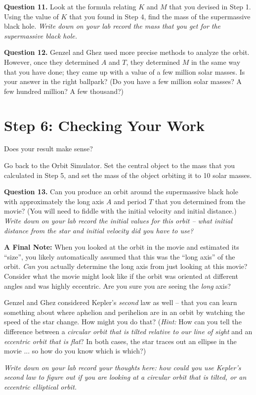 \documentclass[11pt]{article}
\begin{document}
{\bf Question 11.} Look at the formula relating $K$ and $M$ that you devised in Step 1. Using the value of $K$ that you found in Step 4, find the mass of the supermassive black hole. {\it Write down on your lab record the mass that you get for the supermassive black hole.}




{\bf Question 12.} Genzel and Ghez used more precise methods to analyze the orbit. However, once they determined $A$ and $T$, they determined $M$ in the same way that you have done; they came up with a value of a few million solar masses. Is your answer in the right ballpark? (Do you have a few million solar masses? A few hundred million? A few thousand?)

\section{Step 6: Checking Your Work}

Does your result make sense?

Go back to the Orbit Simulator. Set the central object to the mass that you calculated in Step 5, and set the mass of the object orbiting it to 10 solar masses. 


{\bf Question 13.} Can you produce an orbit around the supermassive black hole with approximately the long axis $A$ and period $T$ that you determined from the movie? (You will need to fiddle with the initial velocity and initial distance.) {\it Write down on your lab record the initial values for this orbit -- what initial distance from the star and initial velocity did you have to use?}



{\bf A Final Note:} When you looked at the orbit in the movie and estimated its “size”, you likely automatically assumed that this was the “long axis” of the orbit. {\it Can} you actually determine the long axis from just looking at this movie? Consider what the movie might look like if the orbit was oriented at different angles and was highly eccentric. Are you sure you are seeing the {\it long} axis?

Genzel and Ghez considered Kepler’s {\it second} law as well -- that you can learn something about where aphelion and perihelion are in an orbit by watching the speed of the star change. How might you do that? ({\it Hint:} How can you tell the difference between a {\it circular orbit that is tilted relative to our line of sight} and an {\it eccentric orbit that is flat}? In both cases, the star traces out an ellipse in the movie ... so how do you know which is which?)

{\it Write down on your lab record your thoughts here: how could you use Kepler's second law to figure out if you are looking at a circular orbit that is tilted, or an eccentric elliptical orbit.}
\end{document}
